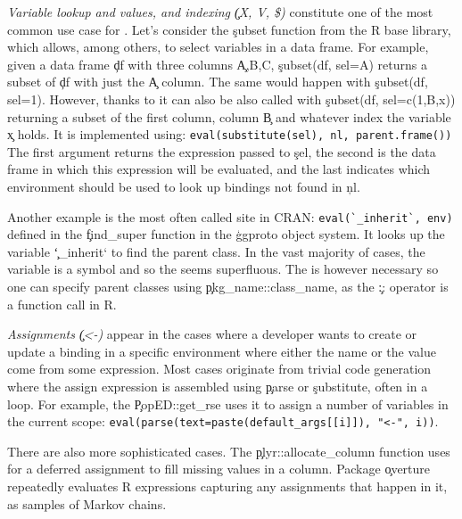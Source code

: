 \documentclass[review,screen,acmsmall,anonymous=true]{acmart}
\begin{document}
\begin{compactitem}[---]

  \item \emph{Variable lookup and values, and indexing \c{(X, V, \$)}}
    constitute one of the most common use case for \eval. Let's consider the
    \c{subset} function from the R base library, which allows, among others, to
    select variables in a data frame. For example, given a data frame \c{df}
    with three columns \c{A,B,C}, \c{subset(df, sel=A)} returns a subset of
    \c{df} with just the \c{A} column. The same would happen with \c{subset(df,
      sel=1)}. However, thanks to \eval it can also be also called with
    \c{subset(df, sel=c(1,B,x))} returning a subset of the first column, column
    \c{B} and whatever index the variable \c{x} holds. It is implemented using:
    \lstinline|eval(substitute(sel), nl, parent.frame())| The first argument
    returns the expression passed to \c{sel}, the second is the data frame in
    which this expression will be evaluated, and the last indicates which
    environment should be used to look up bindings not found in \c{nl}.

    Another example is the most often called \eval site in CRAN:
    \lstinline|eval(`_inherit`, env)| defined in the \c{find\_super} function in
    the \c{ggproto} object system. It looks up the variable \c{`\_inherit`} to
    find the parent class. In the vast majority of cases, the variable is a
    symbol and so the \eval seems superfluous. The \eval is however necessary so
    one can specify parent classes using \c{pkg\_name::class\_name}, as the
    \c{::} operator is a function call in R.

  \item \emph{Assignments \c{(<-)}} appear in the cases where a developer wants
    to create or update a binding in a specific environment where either the
    name or the value come from some expression. Most cases originate from
    trivial code generation where the assign expression is assembled using
    \c{parse} or \c{substitute}, often in a loop. For example, the
    \c{PopED::get\_rse} uses it to assign a number of variables in the current
    scope: \lstinline|eval(parse(text=paste(default_args[[i]]), "<-", i))|.

    There are also more sophisticated cases. The \c{plyr::allocate\_column}
    function uses \eval for a deferred assignment to fill missing values in a
    column. Package \c{overture} repeatedly evaluates R expressions capturing
    any assignments that happen in it, as samples of Markov chains.


\end{compactitem}
\end{document}
